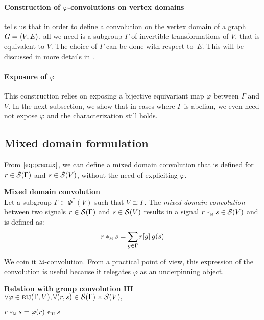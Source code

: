 \paragraph{Construction of $\varphi$-convolutions on vertex domains}
 tells us that in order to define a convolution on the vertex domain of a graph $\gve$, all we need is a subgroup $\Gamma$ of invertible transformations of $V$, that is equivalent to $V$. The choice of $\Gamma$ can be done with respect to~$E$. This will be discussed in more details in .

\paragraph{Exposure of $\varphi$}
This construction relies on exposing a bijective equivariant map $\varphi$ between $\Gamma$ and $V$. In the next subsection, we show that in cases where $\Gamma$ is abelian, we even need not expose $\varphi$ and the characterization still holds.

\subsection{Mixed domain formulation}

From $\eqref{eq:premix}$, we can define a mixed domain convolution \ie that is defined for $r \in \cs(\Gamma)$ and $s \in \cs(V)$, without the need of expliciting $\varphi$.

\begin{definition}\textbf{Mixed domain convolution}\\
Let a subgroup $\Gamma \subset \Phi^*(V)$ such that $V \cong \Gamma$.
The \emph{mixed domain convolution} between two signals $r \in \cs(\Gamma)$ and $s \in \cs(V)$ results in a signal $r \ast_{\M} s \in \cs(V)$ and is defined as:
\begin{gather*}
r \ast_{\M} s = \displaystyle \sum_{g \in \Gamma} r[g] \h{2} g(s)
\end{gather*}
\label{def:convm}
\end{definition}

We coin it $\M$-convolution. From a practical point of view, this expression of the convolution is useful because it relegates $\varphi$ as an underpinning object.%

\begin{lemma}\textbf{Relation with group convolution III}\\
$\forall \varphi \in \bij(\Gamma, V), \forall (r,s) \in \cs(\Gamma) \times \cs(V),$\\
\centerline{$r \ast_{\M} s = \varphi(r) \ast_{\III} s$}
\label{lem:rel3m}
\end{lemma}


